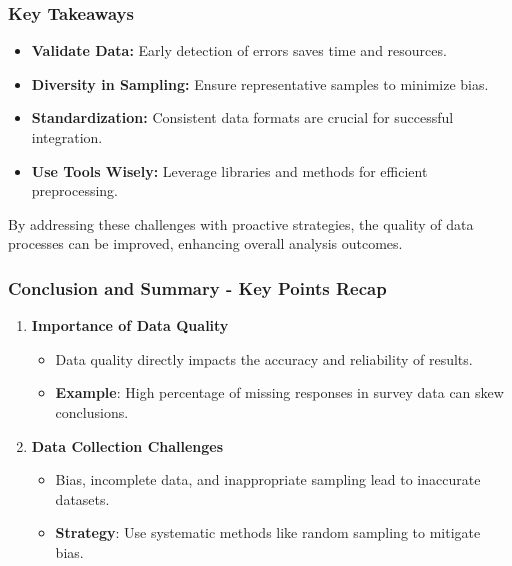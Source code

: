 \documentclass[aspectratio=169]{beamer}
\begin{document}
\begin{frame}[fragile]
    \frametitle{Key Takeaways}
    \begin{itemize}
        \item \textbf{Validate Data:} Early detection of errors saves time and resources.
        \item \textbf{Diversity in Sampling:} Ensure representative samples to minimize bias.
        \item \textbf{Standardization:} Consistent data formats are crucial for successful integration.
        \item \textbf{Use Tools Wisely:} Leverage libraries and methods for efficient preprocessing.
    \end{itemize}
    By addressing these challenges with proactive strategies, the quality of data processes can be improved, enhancing overall analysis outcomes.
\end{frame}

\begin{frame}[fragile]
    \frametitle{Conclusion and Summary - Key Points Recap}
    \begin{enumerate}
        \item \textbf{Importance of Data Quality}
            \begin{itemize}
                \item Data quality directly impacts the accuracy and reliability of results.
                \item \textbf{Example}: High percentage of missing responses in survey data can skew conclusions.
            \end{itemize}
        \item \textbf{Data Collection Challenges}
            \begin{itemize}
                \item Bias, incomplete data, and inappropriate sampling lead to inaccurate datasets.
                \item \textbf{Strategy}: Use systematic methods like random sampling to mitigate bias.
            \end{itemize}
    \end{enumerate}
\end{frame}
\end{document}
